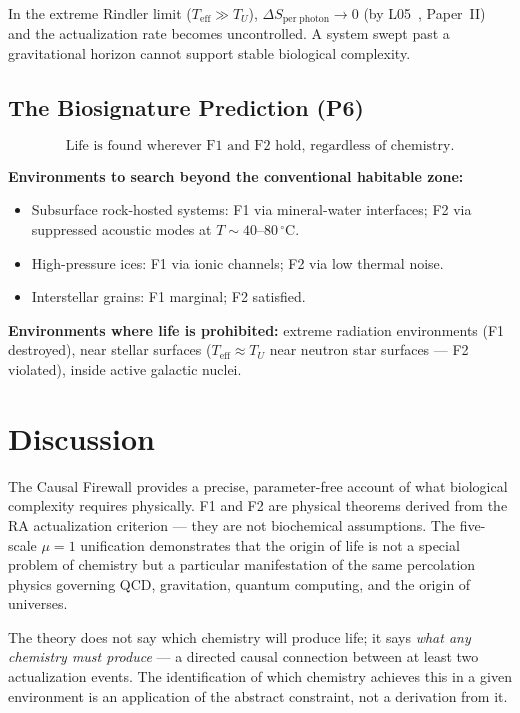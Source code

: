 \documentclass[12pt,a4paper]{article}
\begin{document}
In the extreme Rindler limit ($T_{\mathrm{eff}} \gg T_U$), $\Delta S_{\mathrm{per\;photon}} \to 0$ (by L05~\statusLV, Paper~II) and the actualization rate becomes uncontrolled.  A system swept past a gravitational horizon cannot support stable biological complexity.

\subsection{The Biosignature Prediction (P6)}

\begin{equation}
  \text{Life is found wherever F1 and F2 hold, regardless of chemistry.}
  \label{eq:P6}
\end{equation}

\textbf{Environments to search beyond the conventional habitable zone:}
\begin{itemize}
  \item Subsurface rock-hosted systems: F1 via mineral-water interfaces; F2 via suppressed acoustic modes at $T \sim 40$--$80\,^\circ\mathrm{C}$.
  \item High-pressure ices: F1 via ionic channels; F2 via low thermal noise.
  \item Interstellar grains: F1 marginal; F2 satisfied.
\end{itemize}

\textbf{Environments where life is prohibited:} extreme radiation environments (F1 destroyed), near stellar surfaces ($T_{\mathrm{eff}} \approx T_U$ near neutron star surfaces — F2 violated), inside active galactic nuclei.

\section{Discussion}

The Causal Firewall provides a precise, parameter-free account of what biological complexity requires physically.  F1 and F2 are physical theorems derived from the RA actualization criterion — they are not biochemical assumptions.  The five-scale $\mu=1$ unification demonstrates that the origin of life is not a special problem of chemistry but a particular manifestation of the same percolation physics governing QCD, gravitation, quantum computing, and the origin of universes.

The theory does not say which chemistry will produce life; it says \emph{what any chemistry must produce} — a directed causal connection between at least two actualization events.  The identification of which chemistry achieves this in a given environment is an application of the abstract constraint, not a derivation from it.
\end{document}

